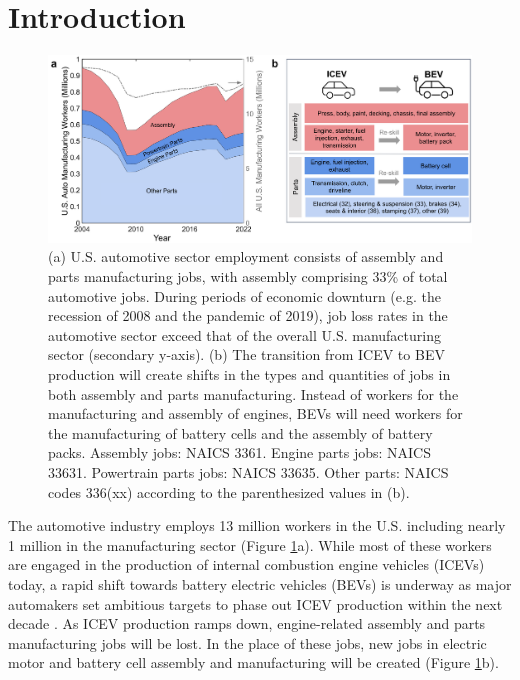 \documentclass[sn-mathphys,Numbered]{sn-jnl}%
\begin{document}
\maketitle

\section{Introduction}


\begin{figure}[tp!]
\centering
\includegraphics[width=1.0\linewidth]{figures/fig_overview.png}
\caption{(a) U.S. automotive sector employment consists of assembly and parts manufacturing jobs, with assembly comprising 33\% of total automotive jobs. During periods of economic downturn (e.g. the recession of 2008 and the pandemic of 2019), job loss rates in the automotive sector exceed that of the overall U.S. manufacturing sector (secondary y-axis). (b) The transition from ICEV to BEV production will create shifts in the types and quantities of jobs in both assembly and parts manufacturing. Instead of workers for the manufacturing and assembly of engines, BEVs will need workers for the manufacturing of battery cells and the assembly of battery packs. Assembly jobs: NAICS 3361. Engine parts jobs: NAICS 33631. Powertrain parts jobs: NAICS 33635. Other parts: NAICS codes 336(xx) according to the parenthesized values in (b).}
\label{fig:overview}
\end{figure}

The automotive industry employs 13 million workers in the U.S.  including nearly 1 million in the manufacturing sector \cite{International_Labor_Organization2020-es, US_Bureau_of_Labor_Statistics2023-vr} (Figure \ref{fig:overview}a). While most of these workers are engaged in the production of internal combustion engine vehicles (ICEVs) today, a rapid shift towards battery electric vehicles (BEVs) is underway as major automakers set ambitious targets to phase out ICEV production within the next decade \cite{International_Energy_Agency2023-dd, National-Academies-2021}. As ICEV production ramps down, engine-related assembly and parts manufacturing jobs will be lost. In the place of these jobs, new jobs in electric motor and battery cell assembly and manufacturing will be created (Figure \ref{fig:overview}b).
\end{document}
